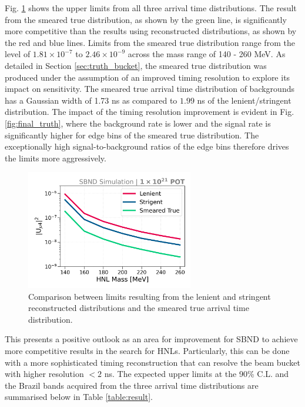 Fig. \ref{fig:nupi0_reco_truth} shows the upper limits from all three arrival time distributions.
The result from the smeared true distribution, as shown by the green line, is significantly more competitive than the results using reconstructed distributions, as shown by the red and blue lines.
Limits from the smeared true distribution range from the level of $1.81 \times 10^{-7}$ to $2.46 \times 10^{-9}$ across the mass range of 140 - 260 MeV. 
As detailed in Section \ref{sec:truth_bucket}, the smeared true distribution was produced under the assumption of an improved timing resolution to explore its impact on sensitivity. 
The smeared true arrival time distribution of backgrounds has a Gaussian width of 1.73 ns as compared to $1.99$ ns of the lenient/stringent distribution.
The impact of the timing resolution improvement is evident in Fig. \ref{fig:final_truth}, where the background rate is lower and the signal rate is significantly higher for edge bins of the smeared true distribution.
The exceptionally high signal-to-background ratios of the edge bins therefore drives the limits more aggressively. 

\begin{figure}[ht!]
    \centering
    \includegraphics[width=0.65\textwidth]{sensitivity_strict_loose_truth}
    \caption[Comparison Between Limits Setting using the Lenient, Stringent and Smeared True Distribution]{Comparison between limits resulting from the lenient and stringent reconstructed distributions and the smeared true arrival time distribution.}
    \label{fig:nupi0_reco_truth}
\end{figure}

This presents a positive outlook as an area for improvement for SBND to achieve more competitive results in the search for HNLs.
Particularly, this can be done with a more sophisticated timing reconstruction that can resolve the beam bucket with higher resolution $< 2$ ns.
The expected upper limits at the 90\% C.L. and the Brazil bands acquired from the three arrival time distributions are summarised below in Table \ref{table:result}.  

